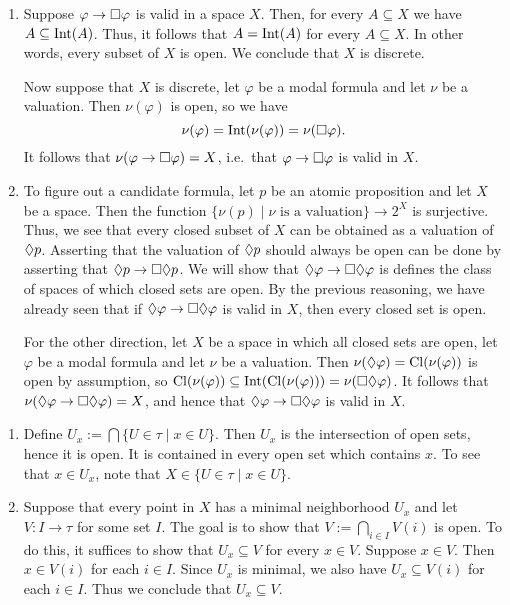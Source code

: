 \documentclass{article}
\begin{document}
\begin{ex}
\begin{enumerate}
\item Suppose $\varphi\to\square\varphi$ is valid in a space $X$. Then, for every
$A\subseteq X$ we have $A\subseteq\mathrm{Int}(A)$. Thus, it follows that
$A=\mathrm{Int}(A)$ for every $A\subseteq X$. In other words, every subset of $X$
is open. We conclude that $X$ is discrete.

Now suppose that $X$ is discrete, let $\varphi$ be a modal formula and let
$\nu$ be a valuation. Then $\nu(\varphi)$ is open, so we have
\begin{equation*}
\nu(\varphi)=\mathrm{Int}(\nu(\varphi))=\nu(\square\varphi).
\end{equation*}
It follows that $\nu(\varphi\to\square\varphi)=X$, i.e.~that $\varphi\to\square\varphi$
is valid in $X$.
\item To figure out a candidate formula, let $p$ be an atomic proposition and let 
$X$ be a space. Then the function
$\{\nu(p)\mid\nu\text{ is a valuation}\}\to 2^X$ is surjective. Thus, we see that
every closed subset of $X$ can be obtained as a valuation of $\lozenge p$. Asserting
that the valuation of $\lozenge p$ should always be open can be done by asserting that
$\lozenge p\to \square\lozenge p$. We will show that $\lozenge\varphi\to\square\lozenge\varphi$ is
defines the class of spaces of which closed sets are open. By the previous reasoning,
we have already seen that if $\lozenge\varphi\to\square\lozenge\varphi$ is valid in $X$, then
every closed set is open.

For the other direction, let $X$ be a space in which all closed sets are open, 
let $\varphi$ be a modal formula and let $\nu$ be a valuation. Then
$\nu(\lozenge\varphi)=\mathrm{Cl}(\nu(\varphi))$ is open by assumption, so
$\mathrm{Cl}(\nu(\varphi))\subseteq\mathrm{Int}(\mathrm{Cl}(\nu(\varphi)))
=\nu(\square\lozenge\varphi)$. It follows that $\nu(\lozenge\varphi\to\square\lozenge\varphi)=X$,
and hence that $\lozenge\varphi\to\square\lozenge\varphi$ is valid in $X$. 
\end{enumerate}
\end{ex}

\begin{ex}
\begin{enumerate}
\item Define $U_x:=\bigcap\{U\in\tau\mid x\in U\}$. Then $U_x$ is the intersection
of open sets, hence it is open. It is contained in every open set which contains
$x$. To see that $x\in U_x$, note that $X\in\{U\in\tau\mid x\in U\}$.
\item Suppose that every point in $X$ has a minimal neighborhood $U_x$ and let
$V:I\to\tau$ for some set $I$. The goal is to show that $V:=\bigcap_{i\in I}V(i)$
is open. To do this, it suffices to show that $U_x\subseteq V$ for every
$x\in V$. Suppose $x\in V$. Then $x\in V(i)$ for each $i\in I$. Since $U_x$ is
minimal, we also have $U_x\subseteq V(i)$ for each $i\in I$. Thus we conclude
that $U_x\subseteq V$.
\end{enumerate}
\end{ex}
\end{document}
